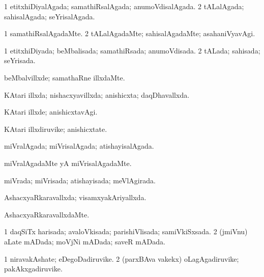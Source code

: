 {{\bentry
{} 
\gl{\gu}
\expl{}
\bmng
\bnum
\num{1} etitxhiDiyalAgada; samathiRsalAgada; anumoVdisalAgada. 
\num{2} tALalAgada; sahisalAgada; seYrisalAgada. 
\enum
\emng
\eentry

\bentry
{} 
\gl{\kirxvi}
\bmng
\bnum
\num{1} samathiRsalAgadaMte. 
\num{2} tALalAgadaMte; sahisalAgadaMte; asahaniVyavAgi. 
\enum
\emng
\eentry

\bentry
{} 
\gl{\gu}
\expl{}
\bmng
\bnum
\num{1} etitxhiDiyada; beMbalisada; samathiRsada; anumoVdisada. 
\num{2} tALada; sahisada; seYrisada. 
\enum
\emng
\eentry

\bentry
{} 
\gl{\kirxvi}
\expl{}
\bmng
beMbalvillxde; samathaRne illxdaMte. 
\emng
\eentry

\bentry
{} 
\gl{\gu}
\expl{}
\bmng
KAtari illxda; nishacxyavillxda; anishicxta; daqDhavallxda. 
\emng
\eentry

\bentry
{} 
\gl{\kirxvi}
\expl{}
\bmng
KAtari illxde; anishicxtavAgi. 
\emng
\eentry

\bentry
{} 
\gl{\nA}
\expl{}
\bmng
KAtari illxdiruvike; anishicxtate. 
\emng
\eentry

\bentry
{} 
\gl{\gu}
\expl{}
\bmng
miVralAgada; miVrisalAgada; atishayisalAgada. 
\emng
\eentry

\bentry
{} 
\gl{\kirxvi}
\expl{}
\bmng
miVralAgadaMte yA miVrisalAgadaMte. 
\emng
\eentry

\bentry
{} 
\gl{\gu}
\expl{}
\bmng
miVrada; miVrisada; atishayisada; meVlAgirada. 
\emng
\eentry

\bentry
{} 
\gl{\gu}
\expl{}
\bmng
AshacxyaRkaravallxda; visamxyakAriyallxda. 
\emng
\eentry

\bentry
{} 
\gl{\kirxvi}
\expl{}
\bmng
AshacxyaRkaravallxdaMte. 
\emng
\eentry

\bentry
{} 
\gl{\gu}
\expl{}
\bmng
\bnum
\num{1} daqSiTx harisada; avaloVkisada; parishiVlisada; samiVkiSxsada. 
\num{2} (jmiVnu) aLate mADada; moVjNi mADada; saveR mADada. 
\enum
\emng
\eentry

\bentry
{} 
\gl{\nA}
\expl{}
\bmng
\bnum
\num{1} niravakAshate; eDegoDadiruvike. 
\num{2} (parxBAva \mo vakekx) oLagAgadiruvike; pakAkxgadiruvike. 
\enum
\emng
\eentry

}}
